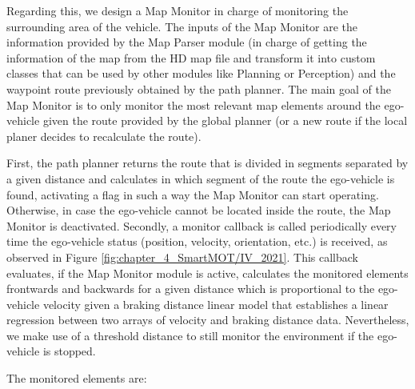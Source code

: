 Regarding this, we design a Map Monitor in charge of monitoring the surrounding area of the vehicle. The inputs of the Map Monitor are the information provided by the Map Parser module (in charge of getting the information of the map from the HD map file and transform it into custom classes that can be used by other modules like Planning or Perception) and the waypoint route previously obtained by the path planner. The main goal of the Map Monitor is to only monitor the most relevant map elements around the ego-vehicle given the route provided by the global planner (or a new route if the local planer decides to recalculate the route). 

First, the path planner returns the route that is divided in segments separated by a given distance and calculates in which segment of the route the ego-vehicle is found, activating a flag in such a way the Map Monitor can start operating. Otherwise, in case the ego-vehicle cannot be located inside the route, the Map Monitor is deactivated. Secondly, a monitor callback is called periodically every time the ego-vehicle status (position, velocity, orientation, etc.) is received, as observed in Figure \ref{fig:chapter_4_SmartMOT/IV_2021}. This callback evaluates, if the Map Monitor module is active, calculates the monitored elements frontwards and backwards for a given distance which is proportional to the ego-vehicle velocity given a braking distance linear model that establishes a linear regression between two arrays of velocity and braking distance data. Nevertheless, we make use of a threshold distance to still monitor the environment if the ego-vehicle is stopped. %

The monitored elements are:

